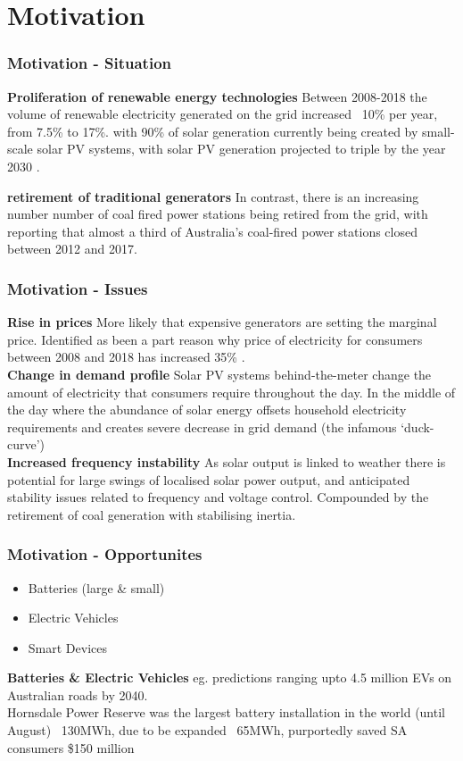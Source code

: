 
\section{Motivation}

\begin{frame}
\frametitle{Motivation - Situation}

\textbf{Proliferation of renewable energy technologies}
Between 2008-2018 the volume of renewable electricity generated on the grid increased ~10\% per year, from 7.5\% to 17\%. \cite{departmentoftheenvironmentenergy2018}
with 90\% of solar generation currently being created by small-scale solar PV systems, with solar PV generation projected to triple by the year 2030 \cite{australianenergymarketoperatorlimited2018}.

\textbf{retirement of traditional generators}
In contrast, there is an increasing number number of coal fired power stations being retired from the grid,
with reporting that almost a third of Australia's coal-fired power stations closed between 2012 and 2017. \cite{doi:10.1111/1467-8489.12289}
\end{frame}


\begin{frame}
\frametitle{Motivation - Issues}
\textbf{Rise in prices}
More likely that expensive generators are setting the marginal price.
Identified as been a part reason why price of electricity for consumers between 2008 and 2018 has increased 35\% \cite{australiancompetitionconsumercommission2018}.\\

\textbf{Change in demand profile}
Solar PV systems behind-the-meter change the amount of electricity that consumers require throughout the day.
In the middle of the day where the abundance of solar energy offsets household electricity requirements and creates severe decrease in grid demand (the infamous `duck-curve') \\

\textbf{Increased frequency instability}
As solar output is linked to weather there is potential for large swings of localised solar power output, and anticipated stability issues related to frequency and voltage control. \cite{australianenergymarketoperatorlimited2018}
Compounded by the retirement of coal generation with stabilising inertia.
\end{frame}

\begin{frame}
\frametitle{Motivation - Opportunites}
\begin{itemize}
\item	Batteries (large \& small)
\item	Electric Vehicles
\item	Smart Devices
\end{itemize}
\textbf{Batteries \& Electric Vehicles}
eg.
predictions ranging upto 4.5 million EVs on Australian roads by 2040. \cite{australianenergymarketoperatorlimited2019}\\
Hornsdale Power Reserve was the largest battery installation in the world (until August) ~130MWh, due to be expanded ~65MWh, purportedly saved SA consumers \$150 million
\end{frame}


